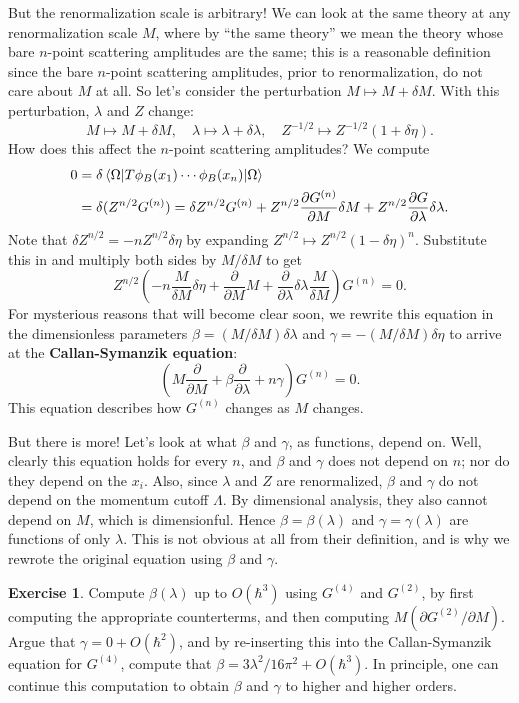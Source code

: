 \documentclass{report}
\theoremstyle{plain}
\theoremstyle{definition}
\newtheorem{exercise}{Exercise}[section]
\theoremstyle{remark}
\begin{document}
But the renormalization scale is arbitrary! We can look at the same
theory at any renormalization scale $M$, where by ``the same theory''
we mean the theory whose bare $n$-point scattering amplitudes are the
same; this is a reasonable definition since the bare $n$-point
scattering amplitudes, prior to renormalization, do not care about $M$
at all. So let's consider the perturbation $M \mapsto M + \delta M$.
With this perturbation, $\lambda$ and $Z$ change:
$$ M \mapsto M + \delta M, \quad \lambda \mapsto \lambda + \delta \lambda, \quad Z^{-1/2} \mapsto Z^{-1/2} (1 + \delta \eta). $$
How does this affect the $n$-point scattering amplitudes? We compute
\begin{align*}
  0
  &= \delta \braket{\Omega|T\phi_B(x_1)\cdots \phi_B(x_n)|\Omega} \\
  &= \delta (Z^{n/2}G^{(n)}) = \delta Z^{n/2} G^{(n)} + Z^{n/2} \frac{\partial G^{(n)}}{\partial M} \delta M + Z^{n/2} \frac{\partial G}{\partial \lambda} \delta \lambda.
\end{align*}
Note that $\delta Z^{n/2} = -nZ^{n/2}\delta \eta$ by expanding
$Z^{n/2} \mapsto Z^{n/2}(1 - \delta \eta)^n$. Substitute this in and
multiply both sides by $M/\delta M$ to get
$$ Z^{n/2} \left(-n \frac{M}{\delta M} \delta \eta + \frac{\partial}{\partial M} M + \frac{\partial}{\partial \lambda} \delta \lambda \frac{M}{\delta M}\right) G^{(n)} = 0. $$
For mysterious reasons that will become clear soon, we rewrite this
equation in the dimensionless parameters
$\beta = (M/\delta M)\delta \lambda$ and
$\gamma = -(M/\delta M)\delta \eta$ to arrive at the {\bf
  Callan-Symanzik equation}:
$$ \left(M\frac{\partial}{\partial M} + \beta \frac{\partial}{\partial \lambda} + n\gamma\right)G^{(n)} = 0. $$
This equation describes how $G^{(n)}$ changes as $M$ changes.

But there is more! Let's look at what $\beta$ and $\gamma$, as
functions, depend on. Well, clearly this equation holds for every $n$,
and $\beta$ and $\gamma$ does not depend on $n$; nor do they depend on
the $x_i$. Also, since $\lambda$ and $Z$ are renormalized, $\beta$ and
$\gamma$ do not depend on the momentum cutoff $\Lambda$. By
dimensional analysis, they also cannot depend on $M$, which is
dimensionful. Hence $\beta = \beta(\lambda)$ and
$\gamma = \gamma(\lambda)$ are functions of only $\lambda$. This is
not obvious at all from their definition, and is why we rewrote the
original equation using $\beta$ and $\gamma$.

\begin{exercise}
  Compute $\beta(\lambda)$ up to $O(\hbar^3)$ using $G^{(4)}$ and
  $G^{(2)}$, by first computing the appropriate counterterms, and then
  computing $M(\partial G^{(2)}/\partial M)$. Argue that
  $\gamma = 0 + O(\hbar^2)$, and by re-inserting this into the
  Callan-Symanzik equation for $G^{(4)}$, compute that
  $\beta = 3\lambda^2/16\pi^2 + O(\hbar^3)$. In principle, one can
  continue this computation to obtain $\beta$ and $\gamma$ to higher
  and higher orders.
\end{exercise}
\end{document}
